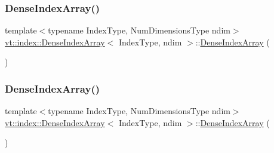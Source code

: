 \subsubsection{\texorpdfstring{Dense\+Index\+Array()}{DenseIndexArray()}\hspace{0.1cm}{\footnotesize\ttfamily [1/6]}}
{\footnotesize\ttfamily template$<$typename Index\+Type, Num\+Dimensions\+Type ndim$>$ \\
\hyperlink{structvt_1_1index_1_1_dense_index_array}{vt\+::index\+::\+Dense\+Index\+Array}$<$ Index\+Type, ndim $>$\+::\hyperlink{structvt_1_1index_1_1_dense_index_array}{Dense\+Index\+Array} (\begin{DoxyParamCaption}{ }\end{DoxyParamCaption})\hspace{0.3cm}{\ttfamily [default]}}

\mbox{\label{structvt_1_1index_1_1_dense_index_array_a835d59e4ac4c01436b7068c2fa05137b}} 
\subsubsection{\texorpdfstring{Dense\+Index\+Array()}{DenseIndexArray()}\hspace{0.1cm}{\footnotesize\ttfamily [2/6]}}
{\footnotesize\ttfamily template$<$typename Index\+Type, Num\+Dimensions\+Type ndim$>$ \\
\hyperlink{structvt_1_1index_1_1_dense_index_array}{vt\+::index\+::\+Dense\+Index\+Array}$<$ Index\+Type, ndim $>$\+::\hyperlink{structvt_1_1index_1_1_dense_index_array}{Dense\+Index\+Array} (\begin{DoxyParamCaption}\item[{\hyperlink{structvt_1_1index_1_1_dense_index_array}{Dense\+Index\+Array}$<$ Index\+Type, ndim $>$ const \&}]{ }\end{DoxyParamCaption})\hspace{0.3cm}{\ttfamily [default]}}

\mbox{\label{structvt_1_1index_1_1_dense_index_array_a2a9e543ccf3fa97a217ad1c981911634}} 

